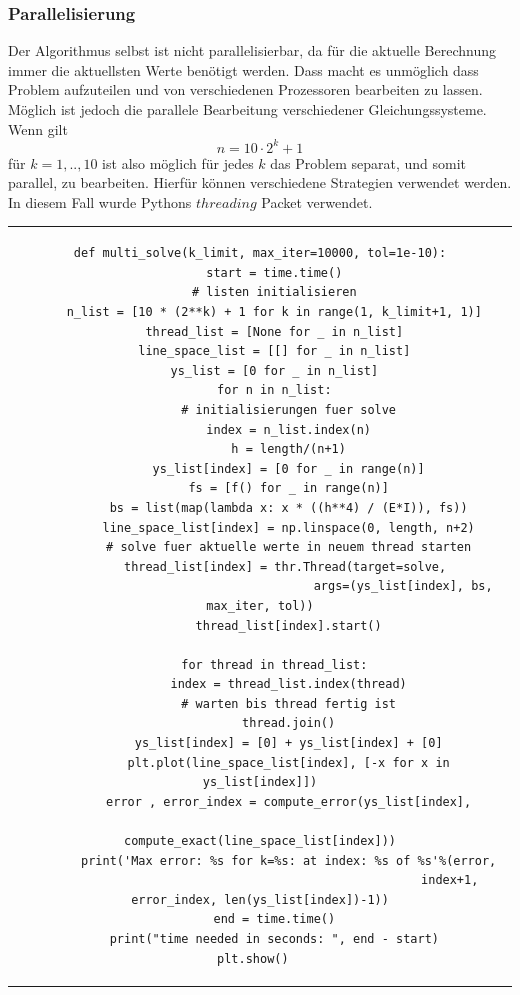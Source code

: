 \documentclass[12pt,titlepage]{article}
\begin{document}
		\subsubsection{Parallelisierung}
			Der Algorithmus selbst ist nicht parallelisierbar, da für die aktuelle Berechnung immer die aktuellsten Werte benötigt werden. Dass macht es unmöglich dass Problem aufzuteilen und von verschiedenen Prozessoren bearbeiten zu lassen. Möglich ist jedoch die parallele Bearbeitung verschiedener Gleichungssysteme. Wenn gilt
			\begin{equation*}
				n = 10 \cdot 2^k +1
			\end{equation*}
			für $k=1,..,10$ ist also möglich für jedes $k$ das Problem separat, und somit parallel, zu bearbeiten.
			Hierfür können verschiedene Strategien verwendet werden. In diesem Fall wurde Pythons $threading$ Packet verwendet.\newline \newline
			\begin{tabular}{c}
			\begin{lstlisting}
def multi_solve(k_limit, max_iter=10000, tol=1e-10):
	start = time.time()
	# listen initialisieren
    n_list = [10 * (2**k) + 1 for k in range(1, k_limit+1, 1)]
    thread_list = [None for _ in n_list]
    line_space_list = [[] for _ in n_list]
    ys_list = [0 for _ in n_list]
    for n in n_list:
    	# initialisierungen fuer solve
    	index = n_list.index(n)
        h = length/(n+1)
        ys_list[index] = [0 for _ in range(n)]
        fs = [f() for _ in range(n)]
        bs = list(map(lambda x: x * ((h**4) / (E*I)), fs))
        line_space_list[index] = np.linspace(0, length, n+2)
        # solve fuer aktuelle werte in neuem thread starten
        thread_list[index] = thr.Thread(target=solve, 
        								args=(ys_list[index], bs, max_iter, tol))
        thread_list[index].start()

    for thread in thread_list:
        index = thread_list.index(thread)
        # warten bis thread fertig ist
        thread.join()
        ys_list[index] = [0] + ys_list[index] + [0]
        plt.plot(line_space_list[index], [-x for x in ys_list[index]])
        error , error_index = compute_error(ys_list[index],
         													compute_exact(line_space_list[index]))
       	print('Max error: %s for k=%s: at index: %s of %s'%(error,
       												 index+1, error_index, len(ys_list[index])-1))
	end = time.time()
    print("time needed in seconds: ", end - start)
    plt.show()		
	 	\end{lstlisting}
		\end{tabular}
\end{document}
